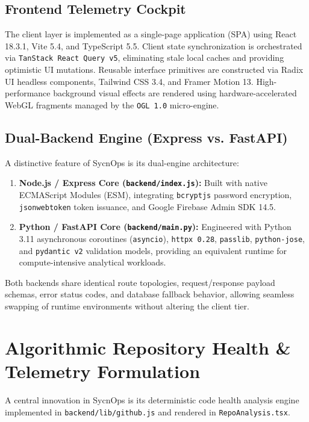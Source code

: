 \documentclass[conference]{IEEEtran}
\begin{document}
\subsection{Frontend Telemetry Cockpit}
The client layer is implemented as a single-page application (SPA) using React 18.3.1, Vite 5.4, and TypeScript 5.5. Client state synchronization is orchestrated via \texttt{TanStack React Query v5}, eliminating stale local caches and providing optimistic UI mutations. Reusable interface primitives are constructed via Radix UI headless components, Tailwind CSS 3.4, and Framer Motion 13. High-performance background visual effects are rendered using hardware-accelerated WebGL fragments managed by the \texttt{OGL 1.0} micro-engine.

\subsection{Dual-Backend Engine (Express vs. FastAPI)}
A distinctive feature of SycnOps is its dual-engine architecture:
\begin{enumerate}
    \item \textbf{Node.js / Express Core (\texttt{backend/index.js}):} Built with native ECMAScript Modules (ESM), integrating \texttt{bcryptjs} password encryption, \texttt{jsonwebtoken} token issuance, and Google Firebase Admin SDK 14.5.
    \item \textbf{Python / FastAPI Core (\texttt{backend/main.py}):} Engineered with Python 3.11 asynchronous coroutines (\texttt{asyncio}), \texttt{httpx 0.28}, \texttt{passlib}, \texttt{python-jose}, and \texttt{pydantic v2} validation models, providing an equivalent runtime for compute-intensive analytical workloads.
\end{enumerate}

Both backends share identical route topologies, request/response payload schemas, error status codes, and database fallback behavior, allowing seamless swapping of runtime environments without altering the client tier.

\section{Algorithmic Repository Health \& Telemetry Formulation}
A central innovation in SycnOps is its deterministic code health analysis engine implemented in \texttt{backend/lib/github.js} and rendered in \texttt{RepoAnalysis.tsx}.
\end{document}

